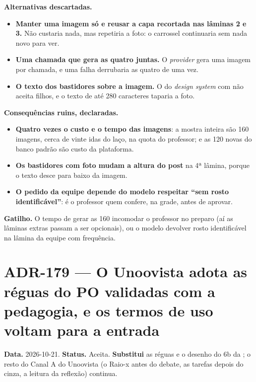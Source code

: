 \textbf{Alternativas descartadas.}

\begin{itemize}
  \item \textbf{Manter uma imagem só e reusar a capa recortada nas lâminas 2 e
    3.} Não custaria nada, mas repetiria a foto: o carrossel continuaria sem
    nada novo para ver.
  \item \textbf{Uma chamada que gera as quatro juntas.} O \emph{provider} gera
    uma imagem por chamada, e uma falha derrubaria as quatro de uma vez.
  \item \textbf{O texto dos bastidores sobre a imagem.} O 
    do \emph{design system} com  não aceita filhos, e o texto de até
    280 caracteres taparia a foto.
\end{itemize}

\textbf{Consequências ruins, declaradas.}

\begin{itemize}
  \item \textbf{Quatro vezes o custo e o tempo das imagens}: a mostra inteira
    são 160 imagens, cerca de vinte idas do laço, na quota do professor; e as
    120 novas do banco padrão são custo da plataforma.
  \item \textbf{Os bastidores com foto mudam a altura do post} na 4ª lâmina,
    porque o texto desce para baixo da imagem.
  \item \textbf{O pedido da equipe depende do modelo respeitar \enquote{sem
    rosto identificável}}: é o professor quem confere, na grade, antes de
    aprovar.
\end{itemize}

\textbf{Gatilho.} O tempo de gerar as 160 incomodar o professor no preparo
(aí as lâminas extras passam a ser opcionais), ou o modelo devolver rosto
identificável na lâmina da equipe com frequência.

\section{ADR-179 --- O Unoovista adota as réguas do PO validadas com a pedagogia, e os termos de uso voltam para a entrada}
\label{adr:exp08ef1b-reguas-do-po}

\textbf{Data.} 2026-10-21. \textbf{Status.} Aceita. \textbf{Substitui} as
réguas e o desenho do 6b da ; o resto do Canal A do Unoovista
(o Raio-x antes do debate, as tarefas depois do cinza, a leitura da reflexão)
continua.

